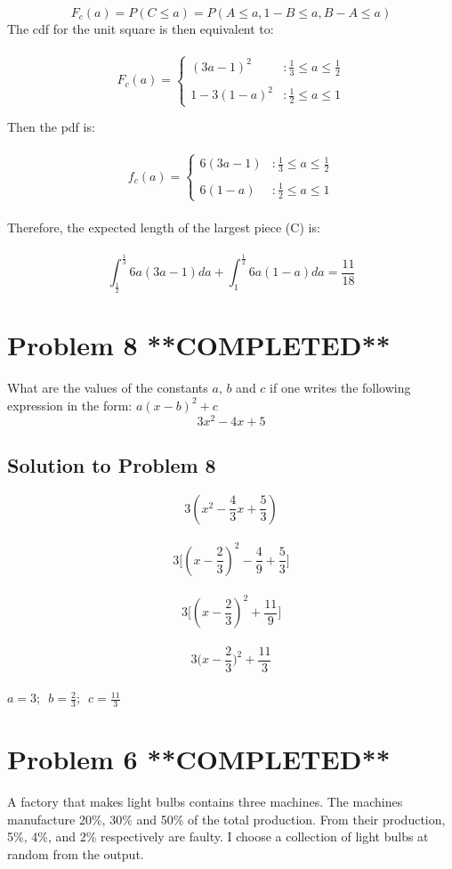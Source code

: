 \documentclass{article}
\begin{document}
$$ F_{c}(a) = P(C \le a) = P(A \le a, 1-B \le a, B-A \le a)$$
The cdf for the unit square is then equivalent to: \\\\
\[F_{c}(a) = \left\{
\begin{array}{lr}
(3a-1)^2 & : \frac{1}{3} \le a \le \frac{1}{2} \\\\
1-3(1-a)^2 & : \frac{1}{2} \le a \le 1
\end{array}
\right.
\]

Then the pdf is: \\\\
\[f_{c}(a) = \left\{
\begin{array}{lr}
6(3a-1) & : \frac{1}{3} \le a \le \frac{1}{2} \\\\
6(1-a) & : \frac{1}{2} \le a \le 1
\end{array}
\right.
\]
\\
Therefore, the expected length of the largest piece (C) is: \\\\
$$\int_{\frac{1}{2}}^{\frac{1}{3}} 6a(3a-1)da + \int_{1}^{\frac{1}{2}} 6a(1-a)da = \frac{11}{18}$$


\section{Problem 8 **COMPLETED**}
What are the values of the constants $a$, $b$ and $c$ if one writes the following expression in the form: $ a(x - b)^{2} + c$ \\ 

 \begin{equation}\label{key}
 3x^{2} - 4x + 5
 \end{equation}
 
\subsection{Solution to Problem 8}
$$ 3(x^2 - \frac{4}{3}x + \frac{5}{3})$$ \\
$$ 3 \Big[ (x - \frac{2}{3})^2 -\frac{4}{9} + \frac{5}{3} \Big] $$ \\
$$ 3 \Big[ (x - \frac{2}{3})^2 + \frac{11}{9} \Big]  $$ \\
$$ 3 \big(x - \frac{2}{3}\big)^2 + \frac{11}{3}  $$ \\
$ a =3; \enspace b= \frac{2}{3}; \enspace c= \frac{11}{3} $

\section{Problem 6 **COMPLETED**}
A factory that makes light bulbs contains three machines. The machines manufacture 20\%, 30\% and 50\% of the total production. From their production, 5\%, 4\%, and 2\% respectively are faulty. I choose a collection of light bulbs at random from the output.
\end{document}
